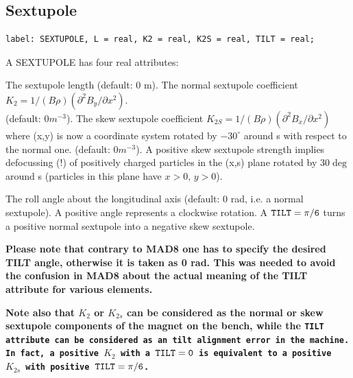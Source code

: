 %
\subsection{Sextupole}
\label{sec:sextupole}

\begin{verbatim}
label: SEXTUPOLE, L = real, K2 = real, K2S = real, TILT = real;
\end{verbatim} 

A SEXTUPOLE has four real attributes: 
\begin{madlist}
     The sextupole length (default: 0 m). 
     The normal sextupole coefficient $K_2 = 1/(B \rho)
      (\partial^2 B_y / \partial x^2)$. \\       
      (default: $0 m^{-3}$). 
     The skew sextupole coefficient 
      $K_{2S} = 1/(B \rho) (\partial^2 B_x / \partial x^2)$ \\
      where (x,y) is now a coordinate system rotated by $-30^\circ$ around s with
      respect to the normal one. (default: $0 m^{-3}$). A positive skew
      sextupole strength implies defocussing (!) of positively charged
      particles in the (x,s) plane rotated by $30\deg$ around s (particles in
      this plane have $x > 0$, $y > 0$).  

     The roll angle about the longitudinal axis (default: 0
      rad, i.e. a normal sextupole). A positive angle represents a
      clockwise rotation. A $\tt{TILT} = \pi/6$ turns a positive normal sextupole
      into a negative skew sextupole.
      
      \textbf{  Please note that contrary to MAD8 one has to specify the
        desired TILT angle, otherwise it is taken as 0 rad. This was needed to
        avoid the confusion in MAD8 about the actual meaning of the TILT
        attribute for various elements. } 
\end{madlist}

\textbf{Note also that $K_2$ or $K_{2s}$ can be considered as the normal
  or skew sextupole components of the magnet on the bench, while the
  \tt{TILT} attribute can be considered as an tilt alignment error in the
  machine. In fact, a positive $K_2$ with a $\tt{TILT} = 0$ is equivalent to a
  positive $K_{2s}$ with positive $\tt{TILT} = \pi/6$.} 

